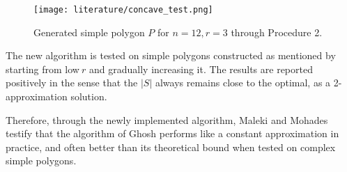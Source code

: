 \begin{figure}[h!]
    \centering
    \texttt{[image: literature/concave\_test.png]}
    \caption{Generated simple polygon $P$ for $n = 12, r = 3$ \cite{maleki2022implementation} through Procedure 2.}
    \label{fig:arbitrary}
\end{figure}

The new algorithm is tested on simple polygons constructed as mentioned by starting from low$~r$ and gradually increasing it. The results are reported positively in the sense that the $|S|$ always remains close to the optimal, as a 2-approximation solution.

Therefore, through the newly implemented algorithm, Maleki and Mohades \cite{maleki2022implementation} testify that the algorithm of Ghosh \cite{GHOSH2010718} performs like a constant approximation in practice, and often better than its theoretical bound when tested on complex simple polygons.
